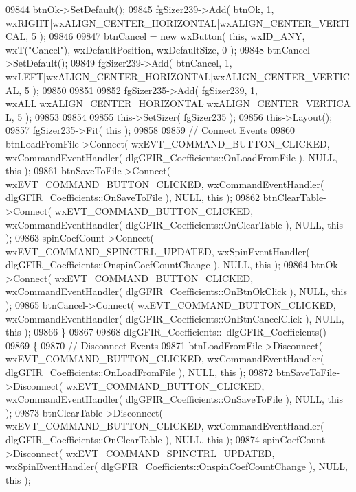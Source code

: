 \begin{DoxyCode}
09844     btnOk->SetDefault(); 
09845     fgSizer239->Add( btnOk, 1, wxRIGHT|wxALIGN\_CENTER\_HORIZONTAL|wxALIGN\_CENTER\_VERTICAL, 5 );
09846     
09847     btnCancel = \textcolor{keyword}{new} wxButton( \textcolor{keyword}{this}, wxID\_ANY, wxT(\textcolor{stringliteral}{"Cancel"}), wxDefaultPosition, wxDefaultSize, 0 );
09848     btnCancel->SetDefault(); 
09849     fgSizer239->Add( btnCancel, 1, wxLEFT|wxALIGN\_CENTER\_HORIZONTAL|wxALIGN\_CENTER\_VERTICAL, 5 );
09850     
09851     
09852     fgSizer235->Add( fgSizer239, 1, wxALL|wxALIGN\_CENTER\_HORIZONTAL|wxALIGN\_CENTER\_VERTICAL, 5 );
09853     
09854     
09855     this->SetSizer( fgSizer235 );
09856     this->Layout();
09857     fgSizer235->Fit( \textcolor{keyword}{this} );
09858     
09859     \textcolor{comment}{// Connect Events}
09860     btnLoadFromFile->Connect( wxEVT\_COMMAND\_BUTTON\_CLICKED, wxCommandEventHandler( 
      dlgGFIR_Coefficients::OnLoadFromFile ), NULL, \textcolor{keyword}{this} );
09861     btnSaveToFile->Connect( wxEVT\_COMMAND\_BUTTON\_CLICKED, wxCommandEventHandler( 
      dlgGFIR_Coefficients::OnSaveToFile ), NULL, \textcolor{keyword}{this} );
09862     btnClearTable->Connect( wxEVT\_COMMAND\_BUTTON\_CLICKED, wxCommandEventHandler( 
      dlgGFIR_Coefficients::OnClearTable ), NULL, \textcolor{keyword}{this} );
09863     spinCoefCount->Connect( wxEVT\_COMMAND\_SPINCTRL\_UPDATED, wxSpinEventHandler( 
      dlgGFIR_Coefficients::OnspinCoefCountChange ), NULL, \textcolor{keyword}{this} );
09864     btnOk->Connect( wxEVT\_COMMAND\_BUTTON\_CLICKED, wxCommandEventHandler( 
      dlgGFIR_Coefficients::OnBtnOkClick ), NULL, \textcolor{keyword}{this} );
09865     btnCancel->Connect( wxEVT\_COMMAND\_BUTTON\_CLICKED, wxCommandEventHandler( 
      dlgGFIR_Coefficients::OnBtnCancelClick ), NULL, \textcolor{keyword}{this} );
09866 \}
09867 
09868 dlgGFIR_Coefficients::~dlgGFIR_Coefficients()
09869 \{
09870     \textcolor{comment}{// Disconnect Events}
09871     btnLoadFromFile->Disconnect( wxEVT\_COMMAND\_BUTTON\_CLICKED, wxCommandEventHandler( 
      dlgGFIR_Coefficients::OnLoadFromFile ), NULL, \textcolor{keyword}{this} );
09872     btnSaveToFile->Disconnect( wxEVT\_COMMAND\_BUTTON\_CLICKED, wxCommandEventHandler( 
      dlgGFIR_Coefficients::OnSaveToFile ), NULL, \textcolor{keyword}{this} );
09873     btnClearTable->Disconnect( wxEVT\_COMMAND\_BUTTON\_CLICKED, wxCommandEventHandler( 
      dlgGFIR_Coefficients::OnClearTable ), NULL, \textcolor{keyword}{this} );
09874     spinCoefCount->Disconnect( wxEVT\_COMMAND\_SPINCTRL\_UPDATED, wxSpinEventHandler( 
      dlgGFIR_Coefficients::OnspinCoefCountChange ), NULL, \textcolor{keyword}{this} );

\end{DoxyCode}
